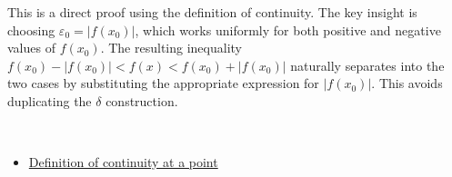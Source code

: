 \begin{remark*}
This is a direct proof using the definition of continuity. The key insight is choosing $\varepsilon_0 = |f(x_0)|$, which works uniformly for both positive and negative values of $f(x_0)$. The resulting inequality $f(x_0) - |f(x_0)| < f(x) < f(x_0) + |f(x_0)|$ naturally separates into the two cases by substituting the appropriate expression for $|f(x_0)|$. This avoids duplicating the $\delta$ construction.
\end{remark*}

\begin{remark*}[Dependencies]~\\
\begin{itemize}
  \item \hyperref[def:continuous-at-point]{Definition of continuity at a point}
\end{itemize}
\end{remark*}
